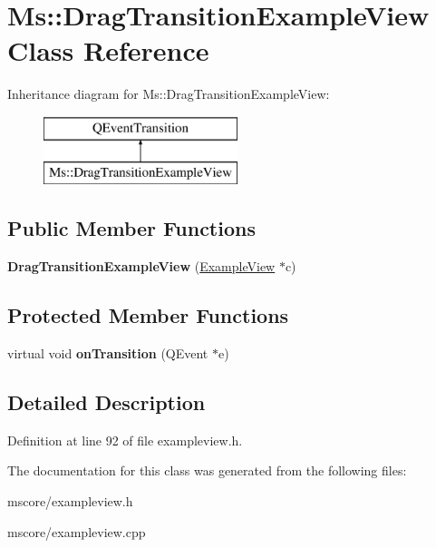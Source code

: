 \hypertarget{class_ms_1_1_drag_transition_example_view}{}\section{Ms\+:\+:Drag\+Transition\+Example\+View Class Reference}
\label{class_ms_1_1_drag_transition_example_view}
Inheritance diagram for Ms\+:\+:Drag\+Transition\+Example\+View\+:\begin{figure}[H]
\begin{center}
\leavevmode
\includegraphics[height=2.000000cm]{class_ms_1_1_drag_transition_example_view}
\end{center}
\end{figure}
\subsection*{Public Member Functions}
\begin{DoxyCompactItemize}
\item 
\mbox{\label{class_ms_1_1_drag_transition_example_view_a1cea32c880cd77a473eefc5d49b03ccf}} 
{\bfseries Drag\+Transition\+Example\+View} (\hyperlink{class_ms_1_1_example_view}{Example\+View} $\ast$c)
\end{DoxyCompactItemize}
\subsection*{Protected Member Functions}
\begin{DoxyCompactItemize}
\item 
\mbox{\label{class_ms_1_1_drag_transition_example_view_afc232cfe46c493a2b9325afa0272c93c}} 
virtual void {\bfseries on\+Transition} (Q\+Event $\ast$e)
\end{DoxyCompactItemize}


\subsection{Detailed Description}


Definition at line 92 of file exampleview.\+h.



The documentation for this class was generated from the following files\+:\begin{DoxyCompactItemize}
\item 
mscore/exampleview.\+h\item 
mscore/exampleview.\+cpp\end{DoxyCompactItemize}
